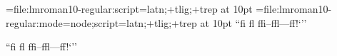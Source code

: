 

\font\testa={file:lmroman10-regular:script=latn;+tlig;+trep}           at 10pt
\font\testb={file:lmroman10-regular:mode=node;script=latn;+tlig;+trep} at 10pt
\testa ``fi fl ffi--ffl---ff!`'' \par
\testb ``fi fl ffi--ffl---ff!`'' \par
\bye
